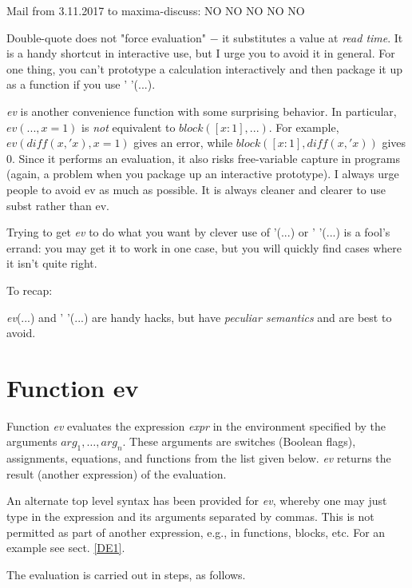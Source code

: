 \documentclass[../Maxima_Workbook.tex]{subfiles}
\begin{document}
Mail from 3.11.2017 to maxima-discuss: NO NO NO NO NO

\lz Double-quote does not "force evaluation" $ - $ it substitutes a value at \emph{read time}. It is a handy shortcut in interactive use, but I urge you to avoid it in general. For one thing, you can't prototype a calculation interactively and then package it up as a function if you use ' '(...).

\lz \emph{ev} is another convenience function with some surprising behavior. In particular, $ ev(...,x=1) $ is \emph{not} equivalent to $ block([x:1],...) $. For example, $ ev(diff(x,'x),x=1) $ gives an error, while $ block([x:1],diff(x,'x)) $ gives 0. Since it performs an evaluation, it also risks free-variable capture in programs (again, a problem when you package up an interactive prototype). I always urge people to avoid ev as much as possible. It is always cleaner and clearer to use subst rather than ev.

\lz Trying to get \emph{ev} to do what you want by clever use of '(...) or ' '(...) is a fool's errand: you may get it to work in one case, but you will quickly find cases where it isn't quite right.

\lz To recap:

\lz \emph{ev}(...) and ' '(...) are handy hacks, but have \emph{peculiar semantics} and are best to avoid.

\section{Function ev}

\lz {} \hfill \tcr{[function]}


\lz Function \emph{ev} evaluates the expression \emph{expr} in the environment specified by the arguments $ arg_1, \dots,arg_n $. These arguments are switches (Boolean flags), assignments, equations, and functions from the list given below. \emph{ev} returns the result (another expression) of the evaluation. 

\lz An alternate top level syntax has been provided for \emph{ev}, whereby one may just type in the expression and its arguments separated by commas. This is not permitted as part of another expression, e.g., in functions, blocks, etc. For an example see sect. \ref{DE1}.

\lz The evaluation is carried out in steps, as follows.
\end{document}
